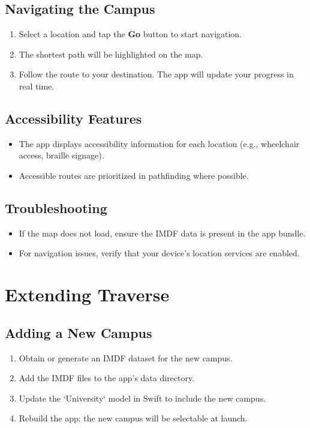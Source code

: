 \documentclass{article}
\begin{document}
\subsection{Navigating the Campus}
\begin{enumerate}
    \item Select a location and tap the \textbf{Go} button to start navigation.
    \item The shortest path will be highlighted on the map.
    \item Follow the route to your destination. The app will update your progress in real time.
\end{enumerate}

\subsection{Accessibility Features}
\begin{itemize}
    \item The app displays accessibility information for each location (e.g., wheelchair access, braille signage).
    \item Accessible routes are prioritized in pathfinding where possible.
\end{itemize}

\subsection{Troubleshooting}
\begin{itemize}
    \item If the map does not load, ensure the IMDF data is present in the app bundle.
    \item For navigation issues, verify that your device's location services are enabled.
\end{itemize}

\section{Extending Traverse}
\subsection{Adding a New Campus}
\begin{enumerate}
    \item Obtain or generate an IMDF dataset for the new campus.
    \item Add the IMDF files to the app's data directory.
    \item Update the `University` model in Swift to include the new campus.
    \item Rebuild the app; the new campus will be selectable at launch.
\end{enumerate}
\end{document}
